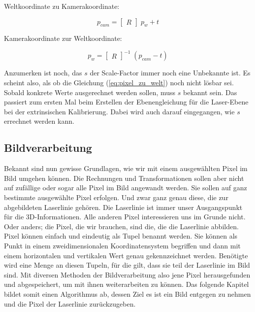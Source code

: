 		Weltkoordinate zu Kamerakoordinate:
		
		\begin{equation}
			p_{cam} = \begin{bmatrix} R \end{bmatrix} \; p_w + t
			\label{eq:welt_zu_kamera}
		\end{equation}
		
		Kamerakoordinate zur Weltkoordinate:
		
		\begin{equation}
			p_w = \begin{bmatrix} R \end{bmatrix}^{-1} \; (p_{cam} - t)
			\label{eq:kamera_zu_welt}
		\end{equation}
		
		Anzumerken ist noch, das \( s \) der Scale-Factor immer noch eine Unbekannte ist. Es scheint also, als ob die Gleichung (\ref{eq:pixel_zu_welt}) noch nicht lösbar sei. Sobald konkrete Werte ausgerechnet werden sollen, muss \( s \) bekannt sein. Das passiert zum ersten Mal beim Erstellen der Ebenengleichung für die Laser-Ebene bei der extrinsischen Kalibrierung. Dabei wird auch darauf eingegangen, wie \( s \) errechnet werden kann.  
		
		\label{chap:transformationen}
	\subsection{Bildverarbeitung}
	Bekannt sind nun gewisse Grundlagen, wie wir mit einem ausgewählten Pixel im Bild umgehen können. Die Rechnungen und Transformationen sollen aber nicht auf zufällige oder sogar alle Pixel im Bild angewandt werden. Sie sollen auf ganz bestimmte ausgewählte Pixel erfolgen. Und zwar ganz genau diese, die zur abgebildeten Laserlinie gehören. Die Laserlinie ist immer unser Ausgangspunkt für die 3D-Informationen. Alle anderen Pixel interessieren uns im Grunde nicht. Oder anders; die Pixel, die wir brauchen, sind die, die die Laserlinie abbilden. \newline
	Pixel können einfach und eindeutig als Tupel benannt werden. Sie können als Punkt in einem zweidimensionalen Koordinatensystem begriffen und dann mit einem horizontalen und vertikalen Wert genau gekennzeichnet werden. Benötigte wird eine Menge an diesen Tupeln, für die gilt, dass sie teil der Laserlinie im Bild sind. Mit diversen Methoden der Bildverarbeitung also jene Pixel herausgefunden und abgespeichert, um mit ihnen weiterarbeiten zu können. Das folgende Kapitel bildet somit einen Algorithmus ab, dessen Ziel es ist ein Bild entgegen zu nehmen und die Pixel der Laserlinie zurückzugeben. 
	
